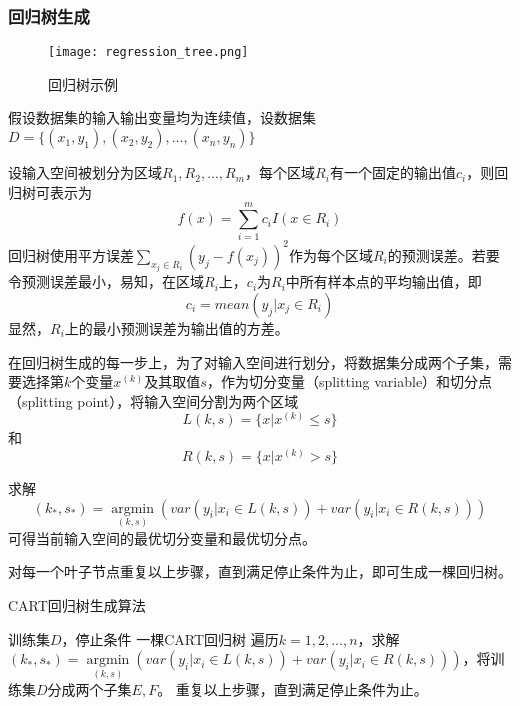 \subsubsection{回归树生成}
\begin{figure}[htbp]
	\texttt{[image: regression\_tree.png]}
	\caption{回归树示例}
	\label{reg_tree}
\end{figure}
	假设数据集的输入输出变量均为连续值，设数据集$D=\{(x_1,y_1),(x_2,y_2),...,(x_n,y_n)\}$\par
	设输入空间被划分为区域$R_1,R_2,...,R_m$，每个区域$R_i$有一个固定的输出值$c_i$，则回归树可表示为
\begin{equation}
	f(x)=\sum\limits_{i=1}^m c_i I(x \in R_i)
\end{equation}
	回归树使用平方误差$\sum\limits_{x_j \in R_i} (y_j - f(x_j))^2$作为每个区域$R_i$的预测误差。若要令预测误差最小，易知，在区域$R_i$上，$c_i$为$R_i$中所有样本点的平均输出值，即
\begin{equation}
	c_i=mean(y_j | x_j \in R_i)
\end{equation}
	显然，$R_i$上的最小预测误差为输出值的方差。\par
	在回归树生成的每一步上，为了对输入空间进行划分，将数据集分成两个子集，需要选择第$k$个变量$x^{(k)}$及其取值$s$，作为切分变量（splitting variable）和切分点（splitting point），将输入空间分割为两个区域
\begin{equation}
	L(k,s)=\{x|x^{(k)}\leq s\}
\end{equation}
	和
\begin{equation}
	R(k,s)=\{ x|x^{(k)}>s\}
\end{equation}\par
	求解
\begin{equation}
	(k_*,s_*)=\mathop{\arg\min}\limits_{(k,s)}(var(y_i|x_i\in L(k,s))+var(y_i|x_i\in R(k,s)))
\end{equation}
	可得当前输入空间的最优切分变量和最优切分点。\par
	对每一个叶子节点重复以上步骤，直到满足停止条件为止，即可生成一棵回归树。\par
\begin{algorithm}
\caption{CART回归树生成算法}
\begin{algorithmic}[1]
\Require 训练集$D$，停止条件
\Ensure 一棵CART回归树
	\State 遍历$k=1,2,...,n$，求解$(k_*,s_*)=\mathop{\arg\min}\limits_{(k,s)}(var(y_i|x_i\in L(k,s))+var(y_i|x_i\in R(k,s)))$，将训练集$D$分成两个子集$E,F$。
	\State 重复以上步骤，直到满足停止条件为止。
\end{algorithmic}
\end{algorithm}
